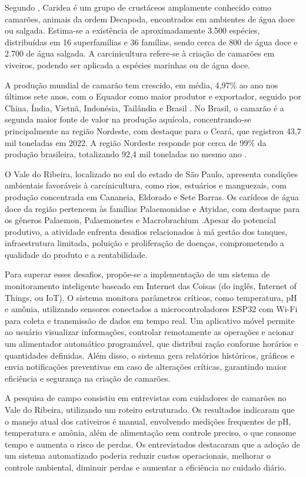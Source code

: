 Segundo \cite{bertini2021}, Caridea é um grupo de crustáceos amplamente conhecido como camarões, animais da ordem Decapoda, encontrados em ambientes de água doce ou salgada. Estima-se a existência de aproximadamente 3.500 espécies, distribuídas em 16 superfamílias e 36 famílias, sendo cerca de 800 de água doce e 2.700 de água salgada. A carcinicultura refere-se à criação de camarões em viveiros, podendo ser aplicada a espécies marinhas ou de água doce.

A produção mundial de camarão tem crescido, em média, 4,97\% ao ano nos últimos sete anos, com o Equador como maior produtor e exportador, seguido por China, Índia, Vietnã, Indonésia, Tailândia e Brasil \cite{Rocha2023, Rocha2024}. No Brasil, o camarão é a segunda maior fonte de valor na produção aquícola, concentrando-se principalmente na região Nordeste, com destaque para o Ceará, que registrou 43,7 mil toneladas em 2022. A região Nordeste responde por cerca de 99\% da produção brasileira, totalizando 92,4 mil toneladas no mesmo ano \cite{Ximenes2023}.

O Vale do Ribeira, localizado no sul do estado de São Paulo, apresenta condições ambientais favoráveis à carcinicultura, como rios, estuários e manguezais, com produção concentrada em Cananeia, Eldorado e Sete Barras. Os carídeos de água doce da região pertencem às famílias Palaemonidae e Atyidae, com destaque para os gêneros Palaemon, Palaemonetes e Macrobrachium \cite{bertini2021}.Apesar do potencial produtivo, a atividade enfrenta desafios relacionados à má gestão dos tanques, infraestrutura limitada, poluição e proliferação de doenças, comprometendo a qualidade do produto e a rentabilidade.

Para superar esses desafios, propõe-se a implementação de um sistema de monitoramento inteligente baseado em Internet das Coisas (do inglês, Internet of Things, ou IoT). O sistema monitora parâmetros críticos, como temperatura, pH e amônia, utilizando sensores conectados a microcontroladores ESP32 com Wi-Fi para coleta e transmissão de dados em tempo real. Um aplicativo móvel permite ao usuário visualizar informações, controlar remotamente as operações e acionar um alimentador automático programável, que distribui ração conforme horários e quantidades definidas. Além disso, o sistema gera relatórios históricos, gráficos e envia notificações preventivas em caso de alterações críticas, garantindo maior eficiência e segurança na criação de camarões.

A pesquisa de campo consistiu em entrevistas com cuidadores de camarões no Vale do Ribeira, utilizando um roteiro estruturado. Os resultados indicaram que o manejo atual dos cativeiros é manual, envolvendo medições frequentes de pH, temperatura e amônia, além de alimentação sem controle preciso, o que consome tempo e aumenta o risco de perdas. Os entrevistados destacaram que a adoção de um sistema automatizado poderia reduzir custos operacionais, melhorar o controle ambiental, diminuir perdas e aumentar a eficiência no cuidado diário.
